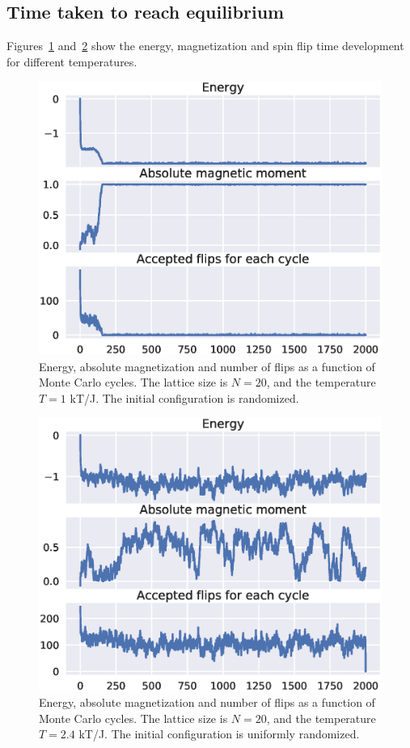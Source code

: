 \documentclass[aps,reprint]{revtex4-1}
\begin{document}
\subsection{Time taken to reach equilibrium}
Figures~\ref{fig:L20T1Random} and~\ref{fig:L20T24Random} show the energy,
magnetization and spin flip time development for different temperatures.
\begin{figure}
  \includegraphics[width=\columnwidth]{figures/L20T1_random.eps}
  \caption{Energy, absolute magnetization and number of flips as a function of
  Monte Carlo cycles. The lattice size is $N = 20$, and the temperature $T = 1$ kT/J.
  The initial configuration is randomized.}
  \label{fig:L20T1Random}
\end{figure}
\begin{figure}
  \includegraphics[width=\columnwidth]{figures/L20T2_4_random.eps}
  \caption{Energy, absolute magnetization and number of flips as a function of
  Monte Carlo cycles. The lattice size is $N = 20$, and the temperature $T = 2.4$ kT/J.
  The initial configuration is uniformly randomized.}
  \label{fig:L20T24Random}
\end{figure}
\end{document}
